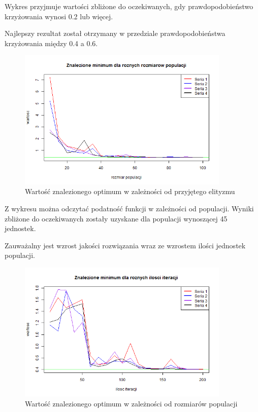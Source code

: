 \documentclass[11pt, a4paper]{article}
\newcommand{\fbi}{\leavevmode{\parindent=1em\indent}}
\begin{document}
\fbi
Wykres przyjmuje wartości zbliżone do oczekiwanych, gdy prawdopodobieństwo krzyżowania wynosi 0.2 lub więcej.

\fbi
Najlepszy rezultat został otrzymany w przedziale prawdopodobieństwa krzyżowania między 0.4 a 0.6.


\begin{figure}[H]
	\centering
	\includegraphics[width=0.9\textwidth]{./assets/Branin4.png} %
	\caption{Wartość znalezionego optimum w zależności od przyjętego elityzmu}
	\label{fig:branin4}
\end{figure}

\fbi
Z wykresu można odczytać podatność funkcji w zależności od populacji. Wyniki zbliżone do oczekiwanych zostały uzyskane dla populacji wynoszącej 45 jednostek.

\fbi
Zauważalny jest wzrost jakości rozwiązania wraz ze wzrostem ilości jednostek populacji.


\begin{figure}[H]
	\centering
	\includegraphics[width=0.9\textwidth]{./assets/Branin5.png} %
	\caption{Wartość znalezionego optimum w zależności od rozmiarów populacji}
	\label{fig:branin5}
\end{figure}
\end{document}
